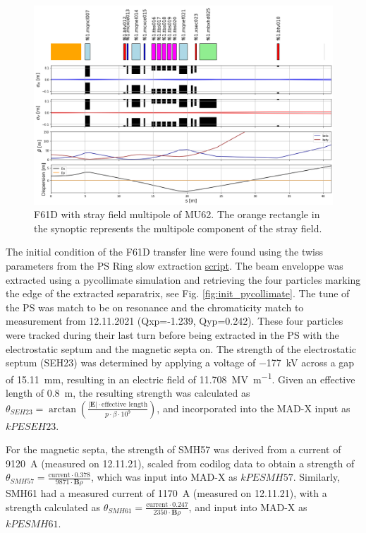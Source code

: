 \begin{figure}[H]
\centering
\includegraphics[width=1.0\textwidth]{02_Simulation/images/F61D_with_stray.png}
\caption{F61D with stray field multipole of MU62. The orange rectangle in the synoptic represents the multipole component of the stray field.}
\label{fig:f61d_with_stray}
\end{figure}


The initial condition of the F61D transfer line were found using the twiss parameters from the PS Ring slow extraction \href{https://gitlab.cern.ch/eljohnso/acc-models-tls-eliott-fork/-/blob/EliottBranch/ps_extraction/east-fast-extraction/Check%20scripts/slow_extraction_trajectory_maptrack_inital_conditions.ipynb}{script}. The beam enveloppe was extracted using a pycollimate simulation and retrieving the four particles marking the edge of the extracted separatrix, see Fig. \ref{fig:init_pycollimate}. The tune of the PS was match to be on resonance and the chromaticity match to measurement from 12.11.2021 (Qxp=-1.239, Qyp=0.242). These four particles were tracked during their last turn before being extracted in the PS with the electrostatic septum and the magnetic septa on. The strength of the electrostatic septum (SEH23) was determined by applying a voltage of \SI{-177}{\kilo\volt} across a gap of \SI{15.11}{\milli\metre}, resulting in an electric field of \SI{11.708}{\mega\volt\per\metre}. Given an effective length of \SI{0.8}{\metre}, the resulting strength was calculated as $\theta_{SEH23} = \arctan \left( \frac{|\mathbf{E}| \cdot \text{effective length}}{p \cdot \beta \cdot 10^9} \right)$, and incorporated into the MAD-X input as $kPESEH23$.

For the magnetic septa, the strength of SMH57 was derived from a current of \SI{9120}{\ampere} (measured on 12.11.21), scaled from codilog data to obtain a strength of $\theta_{SMH57} = \frac{\text{current} \cdot 0.378}{9871 \cdot \mathbf{B} \rho}$, which was input into MAD-X as $kPESMH57$. Similarly, SMH61 had a measured current of \SI{1170}{\ampere} (measured on 12.11.21), with a strength calculated as $\theta_{SMH61} = \frac{\text{current} \cdot 0.247}{2350 \cdot \mathbf{B} \rho}$, and input into MAD-X as $kPESMH61$.



